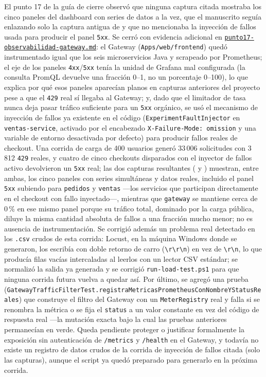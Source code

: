 \documentclass[12pt,a4paper]{article}
\begin{document}
El punto 17 de la guía de cierre observó que ninguna captura citada mostraba los cinco paneles del dashboard con series de datos a la vez, que el manuscrito seguía enlazando solo la captura antigua de  y que no mencionaba la inyección de fallos usada para producir el panel \texttt{5xx}. Se cerró con evidencia adicional en \href{https://github.com/JoseLozanoMorales/TiendaTech/blob/f3520a4/docs/evidencias/punto17-observabilidad-gateway.md}{\texttt{punto17-observabilidad-gateway.md}}: el Gateway (\texttt{Apps/web/frontend}) quedó instrumentado igual que los seis microservicios Java y scrapeado por Prometheus; el eje de los paneles \texttt{4xx}/\texttt{5xx} tenía la unidad de Grafana mal configurada (la consulta PromQL devuelve una fracción 0--1, no un porcentaje 0--100), lo que explica por qué esos paneles aparecían planos en capturas anteriores del proyecto pese a que el \texttt{429} real sí llegaba al Gateway; y, dado que el limitador de tasa nunca deja pasar tráfico suficiente para un \texttt{5xx} orgánico, se usó el mecanismo de inyección de fallos ya existente en el código (\texttt{ExperimentFaultInjector} en \texttt{ventas-service}, activado por el encabezado \texttt{X-Failure-Mode: omission} y una variable de entorno desactivada por defecto) para producir fallos reales de checkout. Una corrida de carga de 400 usuarios generó 33\,006 solicitudes con 3\,812 \texttt{429} reales, y cuatro de cinco checkouts disparados con el inyector de fallos activo devolvieron un \texttt{5xx} real; las dos capturas resultantes ( y ) muestran, entre ambas, los cinco paneles con series simultáneas y datos reales, incluido el panel \texttt{5xx} subiendo para \texttt{pedidos} y \texttt{ventas} —los servicios que participan directamente en el checkout con fallo inyectado—, mientras que \texttt{gateway} se mantiene cerca de 0\,\% en ese mismo panel porque su tráfico total, dominado por la carga pública, diluye la misma cantidad absoluta de fallos a una fracción mucho menor; no es ausencia de instrumentación. Se corrigió además un problema real detectado en los \texttt{.csv} crudos de esta corrida: Locust, en la máquina Windows donde se generaron, los escribía con doble retorno de carro (\texttt{\textbackslash r\textbackslash r\textbackslash n}) en vez de \texttt{\textbackslash r\textbackslash n}, lo que producía filas vacías intercaladas al leerlos con un lector CSV estándar; se normalizó la salida ya generada y se corrigió \texttt{run-load-test.ps1} para que ninguna corrida futura vuelva a quedar así. Por último, se agregó una prueba (\texttt{GatewayTrafficFilterTest.registraMetricasPrometheusConNombreYStatusReales}) que construye el filtro del Gateway con un \texttt{MeterRegistry} real y falla si se renombra la métrica o se fija el \texttt{status} a un valor constante en vez del código de respuesta real —la mutación exacta bajo la cual las pruebas anteriores permanecían en verde. Queda pendiente proteger o justificar formalmente la exposición sin autenticación de \texttt{/metrics} y \texttt{/health} en el Gateway, y todavía no existe un registro de datos crudos de la corrida de inyección de fallos citada (solo las capturas), aunque el script ya quedó preparado para generarlo en la próxima corrida.
\end{document}
